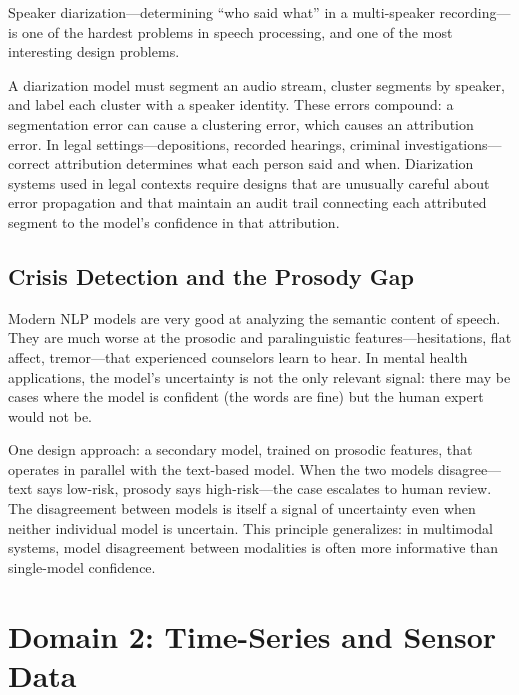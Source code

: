 Speaker diarization---determining ``who said what'' in a multi-speaker recording---is one of the hardest problems in speech processing, and one of the most interesting \hitl design problems.

A diarization model must segment an audio stream, cluster segments by speaker, and label each cluster with a speaker identity. These errors compound: a segmentation error can cause a clustering error, which causes an attribution error. In legal settings---depositions, recorded hearings, criminal investigations---correct attribution determines what each person said and when. Diarization systems used in legal contexts require \hitl designs that are unusually careful about error propagation and that maintain an audit trail connecting each attributed segment to the model's confidence in that attribution.

\subsection{Crisis Detection and the Prosody Gap}

\begin{keyconcept}
Modern NLP models are very good at analyzing the semantic content of speech. They are much worse at the prosodic and paralinguistic features---hesitations, flat affect, tremor---that experienced counselors learn to hear. In mental health applications, the model's uncertainty is not the only relevant signal: there may be cases where the model is confident (the words are fine) but the human expert would not be.
\end{keyconcept}

One design approach: a secondary model, trained on prosodic features, that operates in parallel with the text-based model. When the two models disagree---text says low-risk, prosody says high-risk---the case escalates to human review. The disagreement between models is itself a signal of uncertainty even when neither individual model is uncertain. This principle generalizes: in multimodal systems, model disagreement between modalities is often more informative than single-model confidence.

\section{Domain 2: Time-Series and Sensor Data}
\label{sec:time-series}


